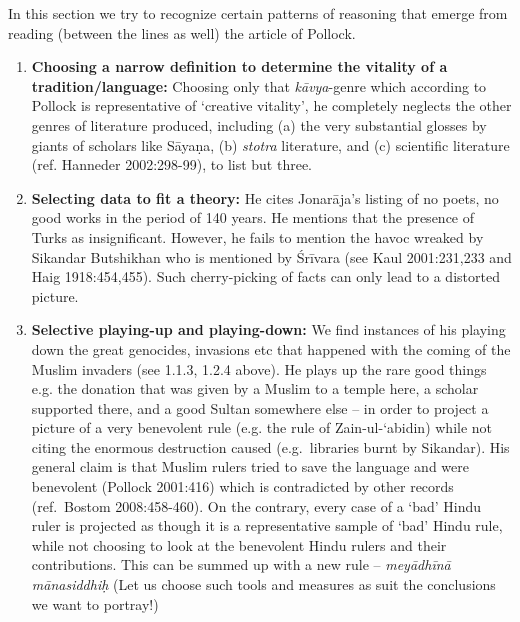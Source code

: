 In this section we try to recognize certain patterns of reasoning that emerge from reading (between the lines as well) the article of Pollock.
\begin{enumerate}
\item {\bf Choosing a narrow definition to determine the vitality of a tradition/language:} Choosing only that {\sl kāvya}-genre which according to Pollock is representative of ‘creative vitality’, he completely neglects the other genres of literature produced, including (a) the very substantial glosses by giants of scholars like Sāyaṇa, (b) {\sl stotra} literature, and (c) scientific literature (ref. Hanneder 2002:298-99), to list but three.
\item {\bf Selecting data to fit a theory:} He cites Jonarāja’s listing of no poets, no good works in the period of 140 years. He mentions that the presence of Turks as insignificant. However, he fails to mention the havoc wreaked by Sikandar Butshikhan who is mentioned by Śrīvara (see Kaul 2001:231,233 and Haig 1918:454,455). Such cherry-picking of facts can only lead to a distorted picture.
\item {\bf Selective playing-up and playing-down:} We find instances of his playing down the great genocides, invasions etc that happened with the coming of the Muslim invaders (see 1.1.3, 1.2.4 above). He plays up the rare good things  e.g. the donation that was given by a Muslim to a temple here, a scholar supported there, and a good Sultan somewhere else – in order to project a picture of a very benevolent rule (e.g. the rule of Zain-ul-‘abidin) while not citing the enormous destruction caused (e.g.\ libraries burnt by Sikandar). His general claim is that Muslim rulers tried to save the language and were benevolent (Pollock 2001:416) which is contradicted by other records (ref.\ Bostom 2008:458-460). On the contrary, every case of a ‘bad’ Hindu ruler is projected as though it is a representative sample of ‘bad’ Hindu rule, while not choosing to look at the benevolent Hindu rulers and their contributions. This can be summed up with a new rule – {\sl meyādhīnā mānasiddhiḥ} (Let us choose such tools and measures as suit the conclusions we want to portray!)

\end{enumerate}
